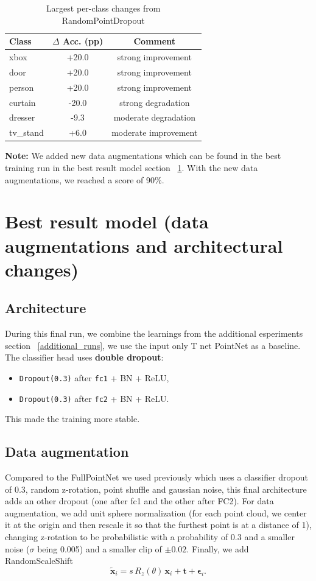 \documentclass[11pt,a4paper]{article}
\begin{document}
\begin{table}[H]
\centering
\caption{Largest per-class changes from RandomPointDropout}
\begin{tabular}{lcc}
\toprule
Class & $\Delta$ Acc. (pp) & Comment \\
\midrule
xbox & +20.0 & strong improvement \\
door & +20.0 & strong improvement \\
person & +20.0 & strong improvement \\
curtain & -20.0 & strong degradation \\
dresser & -9.3 & moderate degradation \\
tv\_stand & +6.0 & moderate improvement \\
\bottomrule
\end{tabular}
\end{table}

\noindent\textbf{Note: } We added new data augmentations which can be found in the best training run in the best result model section ~\ref{final_run}. With the new data augmentations, we reached a score of 90\%. 


\section{Best result model (data augmentations and architectural changes)}
\label{final_run}
\subsection{Architecture}
During this final run, we combine the learnings from the additional esperiments section ~\ref{additional_runs}, we use the input only T net PointNet as a baseline.
The classifier head uses \textbf{double dropout}:
\begin{itemize}[leftmargin=*]
  \item \texttt{Dropout(0.3)} after \texttt{fc1} + BN + ReLU,
  \item \texttt{Dropout(0.3)} after \texttt{fc2} + BN + ReLU.
\end{itemize}

This made the training more stable.

\subsection{Data augmentation}

Compared to the FullPointNet we used previously which uses a classifier dropout of 0.3, random z-rotation, point shuffle and gaussian noise, this final architecture adds an other dropout (one after fc1 and the other after FC2). For data augmentation, we add unit sphere normalization (for each point cloud, we center it at the origin and then rescale it so that the furthest point is at a distance of 1), changing z-rotation to be probabilistic with a probability of 0.3 and a smaller noise ($\sigma$ being 0.005) and a smaller clip of $\pm0.02$. Finally, we add RandomScaleShift 
\[
\tilde{\mathbf{x}}_i = s\,R_z(\theta)\,\mathbf{x}_i + \mathbf{t} + \boldsymbol{\epsilon}_i.
\]
\end{document}
